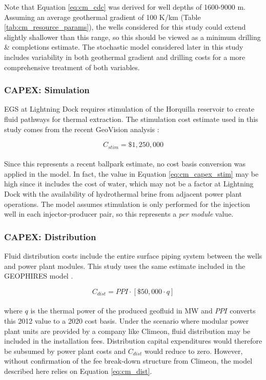 Note that Equation \ref{eq:cm_cdc} was derived for well depths of 1600-9000 m. Assuming an average geothermal gradient of 100 K/km (Table \ref{tab:cm_resource_params}), the wells considered for this study could extend slightly shallower than this range, so this should be viewed as a minimum drilling \& completions estimate. The stochastic model considered later in this study includes variability in both geothermal gradient and drilling costs for a more comprehensive treatment of both variables.

\subsubsection{CAPEX: Simulation}
\label{ch4:cm_stim}

EGS at Lightning Dock requires stimulation of the Horquilla reservoir to create fluid pathways for thermal extraction. The stimulation cost estimate used in this study comes from the recent GeoVision analysis \citep{lowry_geovision_2017}:

\begin{equation}
\label{eq:cm_capex_stim}
    C_{stim} = \$1,250,000
\end{equation}
\\
Since this represents a recent ballpark estimate, no cost basis conversion was applied in the model. In fact, the value in Equation \ref{eq:cm_capex_stim} may be high since it includes the cost of water, which may not be a factor at Lightning Dock with the availability of hydrothermal brine from adjacent power plant operations. The model assumes stimulation is only performed for the injection well in each injector-producer pair, so this represents a \textit{per module} value.

\subsubsection{CAPEX: Distribution}
\label{ch4:cm_capex_dist}

Fluid distribution costs include the entire surface piping system between the wells and power plant modules. This study uses the same estimate included in the GEOPHIRES model \citep{beckers_introducing_2013}.

\begin{equation}
\label{eq:cm_dist}
    C_{dist} = PPI \cdot \left[ \$50,000 \cdot q \right]
\end{equation}
\\
where $q$ is the thermal power of the produced geofluid in MW and $PPI$ converts this 2012 value to a 2020 cost basis. Under the scenario where modular power plant units are provided by a company like Climeon, fluid distribution may be included in the installation fees. Distribution capital expenditures would therefore be subsumed by power plant costs and $C_{dist}$ would reduce to zero. However, without confirmation of the fee break-down structure from Climeon, the model described here relies on Equation \ref{eq:cm_dist}. 

